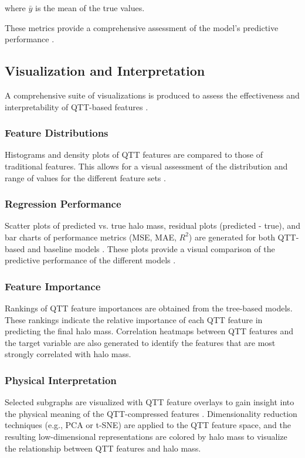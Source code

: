 \documentclass[twocolumn]{aastex631}
\begin{document}
where \(\bar{y}\) is the mean of the true values.

These metrics provide a comprehensive assessment of the model's predictive performance \citep{huppenkothen2023constructingimpactfulmachinelearning,raghav2024photometricanalysispredictingstar}.

\subsection{Visualization and Interpretation}
A comprehensive suite of visualizations is produced to assess the effectiveness and interpretability of QTT-based features \citep{shi2025machinelearningpipelinehunting,donosooliva2025astromer2,yang2025blackholemimickersshapirofree}.

\subsubsection{Feature Distributions}
Histograms and density plots of QTT features are compared to those of traditional features. This allows for a visual assessment of the distribution and range of values for the different feature sets \citep{newburger2023comparingoverlappingdatadistributions,niu2025comparativeanalysisemceegaussian}.

\subsubsection{Regression Performance}
Scatter plots of predicted vs. true halo mass, residual plots (predicted - true), and bar charts of performance metrics (MSE, MAE, \(R^2\)) are generated for both QTT-based and baseline models \citep{larson2024predictingdarkmatterhalo,zhao2025halosgalaxiesviimproved}. These plots provide a visual comparison of the predictive performance of the different models \citep{larson2024predictingdarkmatterhalo}.

\subsubsection{Feature Importance}
Rankings of QTT feature importances are obtained from the tree-based models. These rankings indicate the relative importance of each QTT feature in predicting the final halo mass. Correlation heatmaps between QTT features and the target variable are also generated to identify the features that are most strongly correlated with halo mass.

\subsubsection{Physical Interpretation}
Selected subgraphs are visualized with QTT feature overlays to gain insight into the physical meaning of the QTT-compressed features \citep{ye2024quantizedtensornetworkssolving}. Dimensionality reduction techniques (e.g., PCA or t-SNE) are applied to the QTT feature space, and the resulting low-dimensional representations are colored by halo mass to visualize the relationship between QTT features and halo mass.
\end{document}
